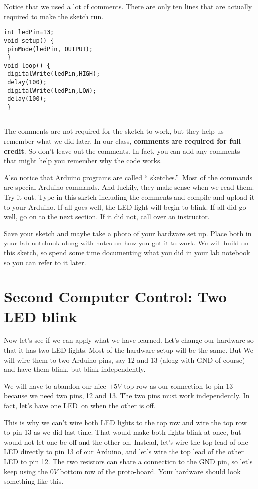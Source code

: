 Notice that we used a lot of comments. There are only ten lines that are
actually required to make the sketch run.

\begin{lstlisting}[language=Arduino] 
int ledPin=13;
void setup() {
 pinMode(ledPin, OUTPUT);
 }
void loop() {
 digitalWrite(ledPin,HIGH);
 delay(100);
 digitalWrite(ledPin,LOW);
 delay(100);
 }
 
\end{lstlisting}

The comments are not required for the sketch to work, but they help us
remember what we did later. In our class, \textbf{comments are required for
full credit}. So don't leave out the comments. In fact, you can add any
comments that might help you remember why the code works.

Also notice that Arduino programs are called \textquotedblleft
sketches.\textquotedblright\ Most of the commands are special Arduino
commands. And luckily, they make sense when we read them. Try it out. Type
in this sketch including the comments and compile and upload it to your
Arduino. If all goes well, the LED light will begin to blink. If all did go
well, go on to the next section. If it did not, call over an instructor.

Save your sketch and maybe take a photo of your hardware set up. Place both
in your lab notebook along with notes on how you got it to work. We will
build on this sketch, so spend some time documenting what you did in your
lab notebook so you can refer to it later.

\section{Second Computer Control: Two LED blink}

Now let's see if we can apply what we have learned. Let's change our
hardware so that it has two LED lights. Most of the hardware setup will be
the same. But We will wire them to two Arduino pins, say 12 and 13 (along
with GND of course) and have them blink, but blink independently.

We will have to abandon our nice $+5\unit{V}$ top row as our connection to
pin 13 because we need two pins, 12 and 13. The two pins must work
independently. In fact, let's have one LED\ on when the other is off.

This is why we can't wire both LED lights to the top row and wire the top
row to pin 13 as we did last time. That would make both lights blink at
once, but would not let one be off and the other on. Instead, let's wire the
top lead of one LED directly to pin 13 of our Arduino, and let's wire the
top lead of the other LED to pin 12. The two resistors can share a
connection to the GND pin, so let's keep using the $0\unit{V}$ bottom row of
the proto-board. Your hardware should look something like this.

